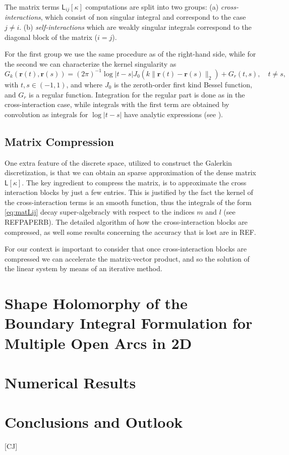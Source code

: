 \documentclass[10pt,reqno]{amsart}
\theoremstyle{remark}
\newcommand{\vr}{\mathbf{r}}
\newcommand{\matL}{\mathsf{L}}
\newcommand{\bmatL}{\boldsymbol{\matL}}
\newcommand{\com}[1]{{{\color{red} [#1]}}}
\numberwithin{equation}{section}
\begin{document}
The matrix terms $\matL_{ij}[\kappa]$ computations are split into two groups: (a) \emph{cross-interactions}, which consist of non singular integral and correspond to the case $j \neq i$. (b) \emph{self-interactions}
which are weakly singular integrals correspond to the diagonal block of the matrix ($i=j$). 

For the first group we use the same procedure as of the right-hand side, while for the second we can characterize the kernel singularity as 
$$G_k(\vr(t), \vr(s) ) = (2\pi)^{-1} \log |t-s| J_0(k \| \vr(t)- \vr(s) \|_2 ) + G_r(t,s), \quad t\neq s,$$
with $t,s\in (-1,1)$, and where $J_0$ is the zeroth-order first kind Bessel function, and $G_r$ is a regular function. Integration for the regular part is done as in the cross-interaction case, while integrals with the first term are obtained by convolution as integrals for $\log |t-s|$ have analytic expressions (see \cite[Remark 4.2]{Jerez-Hanckes2017}).

\subsection{Matrix Compression}

One extra feature of the discrete space, utilized to construct the Galerkin discretization, is that we can obtain an sparse approximation of the dense matrix $\bmatL[\kappa]$. 
The key ingredient to compress the matrix, is to approximate the cross interaction blocks by just a few entries. This is justified by the fact the kernel of the cross-interaction terms is an smooth function, thus the integrals of the form \eqref{eq:matLij} decay super-algebracly with respect to the indices $m$ and $l$ (see REFPAPERB). 
The detailed algorithm of how the cross-interaction blocks are compressed, as well some results concerning the accuracy that is lost are in REF.

For our context is important to consider that once cross-interaction blocks are compressed we can accelerate the matrix-vector product, and so the solution of the linear system by means of an iterative method.  
  

\section{Shape Holomorphy of the Boundary Integral Formulation for Multiple Open Arcs in 2D}
\label{ssec:shape_hol}


\section{Numerical Results}
\label{sec:intro}


\section{Conclusions and Outlook}
\label{sec:intro}

\com{CJ}
\end{document}
